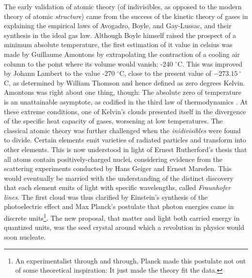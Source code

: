 	The early validation of atomic theory (of indivisibles, as opposed to the modern theory of atomic \emph{structure}) came from the success of the kinetic theory of gases in explaining the empirical laws of Avogadro, Boyle, and Gay-Lussac, and their synthesis in the ideal gas law. Although Boyle himself raised the prospect of a minimum absolute temperature, the first estimation of it value in celsius was made by Guillaume Amontons by extrapolating the contraction of a cooling air column to the point where its volume would vanish: -240 $^\circ$C. This was improved by Johann Lambert to the value -270 $^\circ$C, close to the present value of $-273.15~^\circ$C, as determined by William Thomson and hence defined as zero degrees Kelvin. Amontons was right about one thing, though: The absolute zero of temperature is an unattainable asymptote, as codified in the third law of thermodynamics \cite{Masanes17}. At these extreme conditions, one of Kelvin's clouds presented itself in the divergence of the specific heat capacity of gases, worsening at low temperatures. 
	The classical atomic theory was further challenged when the \emph{inidivisibles} were found to divide. 
	Certain elements emit varieties of radiated particles and transform into other elements. 
	This is now understood in light of Ernest Rutherford's thesis that all atoms contain positively-charged nuclei, considering evidence from the scattering experiments conducted by Hans Geiger and Ernest Marsden. 
	This would eventually be married with the understanding of the distinct discovery that each element emits of light with specific wavelengths, called \emph{Fraunhofer lines}.
	The first cloud was thus clarified by Einstein's synthesis of the photoelectric effect and Max Planck's postulate that photon energies came in discrete units\footnote{An experimentalist through and through, Planck made this postulate not out of some theoretical inspiration: It just made the theory fit the data.}. 
	The new proposal, that matter and light both carried energy in quantized units, was the seed crystal around which a revolution in physics would soon nucleate.

